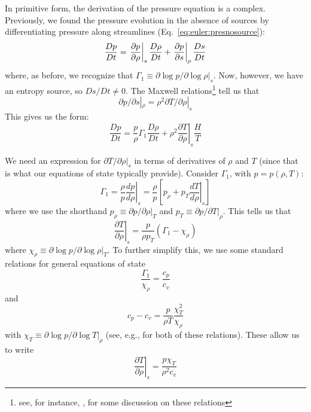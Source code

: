 In primitive form, the derivation of the pressure equation is a
complex.  Previously, we found the pressure evolution in the absence
of sources by differentiating pressure along streamlines
(Eq.~\ref{eq:euler:presnosource}):
\begin{equation}
\frac{Dp}{Dt} = \left . \frac{\partial p}{\partial \rho} \right |_s
     {\frac{{D\rho}}{D t}} + 
     \left . \frac{\partial p}{\partial s} \right |_\rho
     {\frac{{Ds}}{D t}}
\end{equation}
where, as before, we recognize that $\Gamma_1 \equiv \partial \log p/\partial \log \rho |_s$.
Now, however, we have an entropy source, so $Ds/Dt \ne 0$.  
The Maxwell relations\footnote{see, for instance, \cite{shu}, for some discussion
on these relations} tell us that
\begin{equation}
\partial p/\partial s |_\rho = \rho^2 \partial T/\partial \rho |_s
\end{equation}
This gives us the form:
\begin{equation}
\frac{Dp}{Dt} = \frac{p}{\rho} \Gamma_1 \frac{D\rho}{Dt} +
     \left . \rho^2 \frac{\partial T}{\partial \rho} \right |_s
     \frac{H}{T}
\end{equation}

We need an expression for $\partial T/\partial \rho |_s$ in terms of
derivatives of $\rho$ and $T$ (since that is what our equations of
state typically provide).  Consider $\Gamma_1$, with $p = p(\rho, T)$:
\begin{equation}
  \Gamma_1 = \frac{\rho}{p} \left . \frac{dp}{d\rho} \right |_s
  = \frac{\rho}{p} \left [ p_\rho + p_T \left . \frac{dT}{d\rho} \right |_s \right ]
\end{equation}
where we use the shorthand $p_\rho \equiv \partial p/\partial \rho |_T$ and
$p_T \equiv \partial p/\partial T |_\rho$.  This tells us that
\begin{equation}
  \left . \frac{\partial T}{\partial \rho} \right |_s = \frac{p}{\rho p_T} (\Gamma_1 - \chi_\rho)
\end{equation}
where $\chi_\rho \equiv \partial \log p / \partial \log \rho |_T$.  To further simplify this,
we use some standard relations for general equations of state
\begin{equation}
\frac{\Gamma_1}{\chi_\rho} = \frac{c_p}{c_v}
\end{equation}
and
\begin{equation}
  c_p - c_v = \frac{p}{\rho T} \frac{\chi_T^2}{\chi_\rho}
\end{equation}
with $\chi_T \equiv \partial \log p / \partial \log T |_\rho$
(see, e.g., \cite{HKT} for both of these relations).  These allow us to write
\begin{equation}
  \left . \frac{\partial T}{\partial \rho} \right |_s = \frac{p\chi_T}{\rho^2 c_v}
\end{equation}

